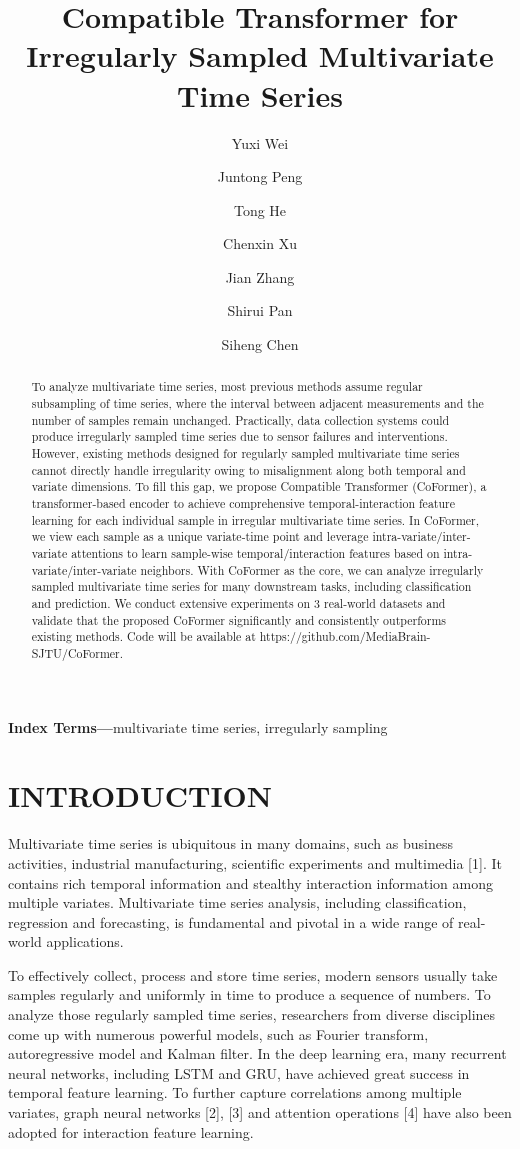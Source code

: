 \documentclass[twocolumn]{article}
\title{Compatible Transformer for Irregularly Sampled Multivariate Time Series}
\author[1*]{Yuxi Wei}
\author[1]{Juntong Peng}
\author[2]{Tong He}
\author[1]{Chenxin Xu}
\author[2]{Jian Zhang}
\author[3]{Shirui Pan}
\author[1\dagger]{Siheng Chen}
\affil[1]{Cooperative Medianet Innovation Center, Shanghai Jiao Tong University}
\affil[2]{Amazon Web Service}
\affil[3]{University of Technology Sydney}
\begin{document}
\maketitle

\begin{abstract}
To analyze multivariate time series, most previous methods assume regular subsampling of time series, where the interval between adjacent measurements and the number of samples remain unchanged. Practically, data collection systems could produce irregularly sampled time series due to sensor failures and interventions. However, existing methods designed for regularly sampled multivariate time series cannot directly handle irregularity owing to misalignment along both temporal and variate dimensions. To fill this gap, we propose Compatible Transformer (CoFormer), a transformer-based encoder to achieve comprehensive temporal-interaction feature learning for each individual sample in irregular multivariate time series. In CoFormer, we view each sample as a unique variate-time point and leverage intra-variate/inter-variate attentions to learn sample-wise temporal/interaction features based on intra-variate/inter-variate neighbors. With CoFormer as the core, we can analyze irregularly sampled multivariate time series for many downstream tasks, including classification and prediction. We conduct extensive experiments on 3 real-world datasets and validate that the proposed CoFormer significantly and consistently outperforms existing methods. Code will be available at https://github.com/MediaBrain-SJTU/CoFormer.
\end{abstract}

\textbf{Index Terms—}multivariate time series, irregularly sampling

\section{INTRODUCTION}

Multivariate time series is ubiquitous in many domains, such as business activities, industrial manufacturing, scientific experiments and multimedia [1]. It contains rich temporal information and stealthy interaction information among multiple variates. Multivariate time series analysis, including classification, regression and forecasting, is fundamental and pivotal in a wide range of real-world applications.

To effectively collect, process and store time series, modern sensors usually take samples regularly and uniformly in time to produce a sequence of numbers. To analyze those regularly sampled time series, researchers from diverse disciplines come up with numerous powerful models, such as Fourier transform, autoregressive model and Kalman filter. In the deep learning era, many recurrent neural networks, including LSTM and GRU, have achieved great success in temporal feature learning. To further capture correlations among multiple variates, graph neural networks [2], [3] and attention operations [4] have also been adopted for interaction feature learning.
\end{document}
